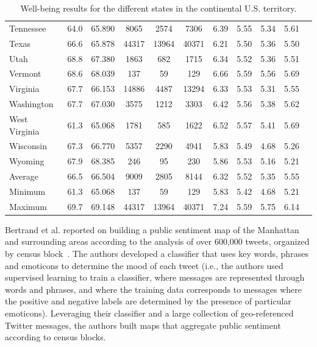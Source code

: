 \documentclass{acm_proc_article-sp}
\begin{document}
\begin{table}[t!]
\begin{center}
\begin{tabular}{l c c c c c c c c c c }
Tennessee      & 64.0 & 65.890 & 8065 & 2574 & 7306 & 6.39 & 5.55 & 5.34 & 5.61 \\
Texas          & 66.6 & 65.878 & 44317 & 13964 & 40371 & 6.21 & 5.50 & 5.36 & 5.50 \\
Utah           & 68.8 & 67.380 & 1863 & 682 & 1715 & 6.34 & 5.52 & 5.36 & 5.51 \\
Vermont        & 68.6 & 68.039 & 137 & 59 & 129 & 6.66 & 5.59 & 5.56 & 5.69 \\
Virginia       & 67.7 & 66.153 & 14886 & 4487 & 13294 & 6.33 & 5.53 & 5.31 & 5.55 \\
Washington     & 67.7 & 67.030 & 3575 & 1212 & 3303 & 6.42 & 5.56 & 5.38 & 5.62 \\
West Virginia  & 61.3 & 65.068 & 1781 & 585 & 1622 & 6.52 & 5.57 & 5.41 & 5.69 \\
Wisconsin      & 67.3 & 66.770 & 5357 & 2290 & 4941 & 5.83 & 5.49 & 4.68 & 5.26 \\
Wyoming        & 67.9 & 68.385 & 246 & 95 & 230 & 5.86 & 5.53 & 5.16 & 5.21 \\
\hline
Average        & 66.5 & 66.504 & 9009 & 2805 & 8144 & 6.32 & 5.52 & 5.35 & 5.55 \\
Minimum        & 61.3 & 65.068 & 137 & 59 & 129 & 5.83 & 5.42 & 4.68 & 5.21 \\
Maximum        & 69.7 & 69.148 & 44317 & 13964 & 40371 & 7.24 & 5.59 & 5.75 & 6.14 \\
\hline
\end{tabular}
\end{center}
\caption{Well-being results for the different states in the continental U.S. territory.}
\label{t1}
\end{table}

Bertrand et al. reported on building a public sentiment map of the Manhattan and surrounding areas according to the analysis of over 600,000 tweets, organized by census block~\cite{Bertrand:2013:Tweets}. The authors developed a classifier that uses key words, phrases and emoticons to determine the mood of each tweet (i.e., the authors used supervised learning to train a classifier, where messages are represented through words and phrases, and where the training data corresponds to messages where the positive and negative labels are determined by the presence of particular emoticons). Leveraging their classifier and a large collection of geo-referenced Twitter messages, the authors built maps that aggregate public sentiment according to census blocks.
\end{document}
